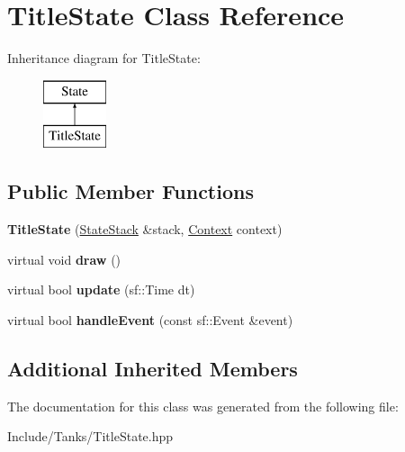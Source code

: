 \hypertarget{class_title_state}{}\section{Title\+State Class Reference}
\label{class_title_state}
Inheritance diagram for Title\+State\+:\begin{figure}[H]
\begin{center}
\leavevmode
\includegraphics[height=2.000000cm]{class_title_state}
\end{center}
\end{figure}
\subsection*{Public Member Functions}
\begin{DoxyCompactItemize}
\item 
\hypertarget{class_title_state_a9fb6569d8ed77db85dcf8af2890c112c}{}{\bfseries Title\+State} (\hyperlink{class_state_stack}{State\+Stack} \&stack, \hyperlink{struct_state_1_1_context}{Context} context)\label{class_title_state_a9fb6569d8ed77db85dcf8af2890c112c}

\item 
\hypertarget{class_title_state_a0626f31f769d6f88eccc4880c153a0d2}{}virtual void {\bfseries draw} ()\label{class_title_state_a0626f31f769d6f88eccc4880c153a0d2}

\item 
\hypertarget{class_title_state_a722fcb2a30f05ea3821ea1ed4c841eec}{}virtual bool {\bfseries update} (sf\+::\+Time dt)\label{class_title_state_a722fcb2a30f05ea3821ea1ed4c841eec}

\item 
\hypertarget{class_title_state_af9e452529d3c3eeb4b8ee89cf8cb2ddf}{}virtual bool {\bfseries handle\+Event} (const sf\+::\+Event \&event)\label{class_title_state_af9e452529d3c3eeb4b8ee89cf8cb2ddf}

\end{DoxyCompactItemize}
\subsection*{Additional Inherited Members}


The documentation for this class was generated from the following file\+:\begin{DoxyCompactItemize}
\item 
Include/\+Tanks/Title\+State.\+hpp\end{DoxyCompactItemize}
